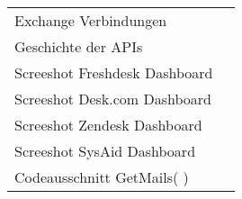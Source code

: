 \documentclass[fontsize=12pt]{scrartcl}
\begin{document}

\newpage



\newpage



\newpage


\begin{flushleft}
\begin{tabularx}{\textwidth}{Xr}
	Exchange Verbindungen \dotfill   &   \pageref{Exchange_Verbindungen}\\
	Geschichte der APIs \dotfill   &   \pageref{API_Geschichte}\\
	Screeshot Freshdesk Dashboard \dotfill   &   \pageref{Freshdesk}\\
	Screeshot Desk.com Dashboard  \dotfill   &   \pageref{Deskcom}\\
	Screeshot Zendesk Dashboard  \dotfill   &   \pageref{Zendesk}\\
	Screeshot SysAid Dashboard  \dotfill   &   \pageref{SysAid}\\
	Codeausschnitt GetMails( )  \dotfill   &   \pageref{Codeausschnitt}\\
\end{tabularx}
\end{flushleft}

\newpage



\newpage



\end{document}
